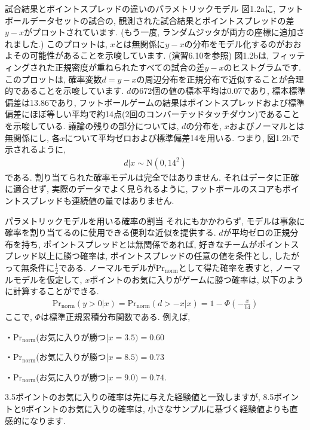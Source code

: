 \documentclass[10pt,dvipdfmx,a4]{beamer}
\newcommand{\eqn}[1]{\begin{align*}#1\end{align*}}
\begin{document}

\begin{frame}{試合結果とポイントスプレッドの違いのパラメトリックモデル}
図1.2aに, フットボールデータセットの試合の, 観測された試合結果とポイントスプレッドの差$y-x$がプロットされています.
(もう一度, ランダムジッタが両方の座標に追加されました.)
このプロットは, $x$とは無関係に$y-x$の分布をモデル化するのがおおよその可能性があることを示唆しています.
(演習6.10を参照)
図1.2bは, フィッティングされた正規密度が重ねられたすべての試合の差$y-x$のヒストグラムです.
このプロットは, 確率変数$d=y-x$の周辺分布を正規分布で近似することが合理的であることを示唆しています.
$d$の672個の値の標本平均は0.07であり, 標本標準偏差は13.86であり, フットボールゲームの結果はポイントスプレッドおよび標準偏差にほぼ等しい平均で約14点(2回のコンバーテッドタッチダウン)であることを示唆している.
議論の残りの部分については, $d$の分布を, $x$およびノーマルとは無関係にし, 各$x$について平均ゼロおよび標準偏差14を用いる.
つまり, 図1.2bで示されるように, 
\eqn{ d|x \sim \text{N}(0,14^2)}
である.
割り当てられた確率モデルは完全ではありません.
それはデータに正確に適合せず, 実際のデータでよく見られるように, フットボールのスコアもポイントスプレッドも連続値の量ではありません.
\end{frame}


\begin{frame}{パラメトリックモデルを用いる確率の割当}
それにもかかわらず, モデルは事象に確率を割り当てるのに使用できる便利な近似を提供する.
$d$が平均ゼロの正規分布を持ち, ポイントスプレッドとは無関係であれば, 好きなチームがポイントスプレッド以上に勝つ確率は, ポイントスプレッドの任意の値を条件とし, したがって無条件に$\tfrac{1}{2}$である.
ノーマルモデルが$\text{Pr}_{\text{norm}}$として得た確率を表すと, ノーマルモデルを仮定して, $x$ポイントのお気に入りがゲームに勝つ確率は, 以下のように計算することができる.
\eqn{\text{Pr}_{\text{norm}}(y>0|x)=\text{Pr}_{\text{norm}}(d>-x|x)=1-\Phi\left(-\frac{x}{14}\right)}
ここで, $\Phi$は標準正規累積分布関数である.
例えば,

・$\text{Pr}_{\text{norm}}$(お気に入りが勝つ|$x=3.5)=0.60$

・$\text{Pr}_{\text{norm}}$(お気に入りが勝つ|$x=8.5)=0.73$

・$\text{Pr}_{\text{norm}}$(お気に入りが勝つ|$x=9.0)=0.74$.

3.5ポイントのお気に入りの確率は先に与えた経験値と一致しますが, 8.5ポイントと9ポイントのお気に入りの確率は, 小さなサンプルに基づく経験値よりも直感的になります.
\end{frame}
\end{document}
